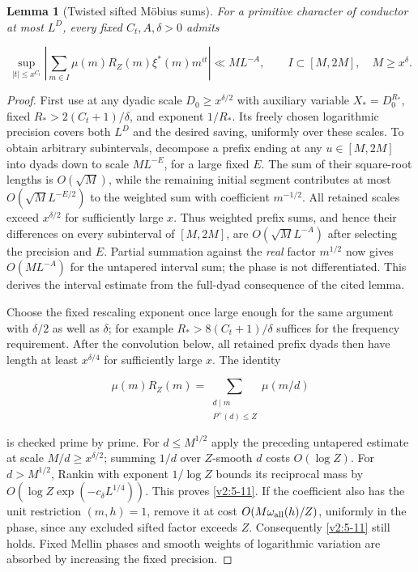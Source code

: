 \documentclass[11pt]{article}
\newtheorem{lemma}[theorem]{Lemma}
\theoremstyle{definition}
\theoremstyle{remark}
\numberwithin{equation}{section}
\begin{document}
\begin{lemma}[Twisted sifted M\"obius sums]\label{input:sifted}
For a primitive character of conductor at most $L^D$, every fixed $C_t,A,\delta>0$ admits


\begin{equation}\label{v2:5-11}
\sup_{|t|\le x^{C_t}}\left|\sum_{m\in I}\mu(m)R_Z(m)\xi^*(m)m^{it}\right|
\ll M L^{-A},\qquad I\subset[M,2M],\quad M\ge x^\delta.
\end{equation}


\end{lemma}\begin{proof}First use \cite[Lemma~3.9(ii)]{MSTT} at any dyadic scale $D_0\ge x^{\delta/2}$ with auxiliary variable $X_*=D_0^{R_*}$, fixed $R_*>2(C_t+1)/\delta$, and exponent $1/R_*$. Its freely chosen logarithmic precision covers both $L^D$ and the desired saving, uniformly over these scales. To obtain arbitrary subintervals, decompose a prefix ending at any $u\in[M,2M]$ into dyads down to scale $M L^{-E}$, for a large fixed $E$. The sum of their square-root lengths is $O(\sqrt M)$, while the remaining initial segment contributes at most $O(\sqrt M L^{-E/2})$ to the weighted sum with coefficient $m^{-1/2}$. All retained scales exceed $x^{\delta/2}$ for sufficiently large $x$. Thus weighted prefix sums, and hence their differences on every subinterval of $[M,2M]$, are $O(\sqrt M L^{-A})$ after selecting the precision and $E$. Partial summation against the \emph{real} factor $m^{1/2}$ now gives $O(ML^{-A})$ for the untapered interval sum; the phase is not differentiated. This derives the interval estimate from the full-dyad consequence of the cited lemma.

Choose the fixed rescaling exponent once large enough for the
same argument with $\delta/2$ as well as $\delta$; for example
$R_*>8(C_t+1)/\delta$ suffices for the frequency requirement.
After the convolution below, all retained prefix dyads then
have length at least $x^{\delta/4}$ for sufficiently large $x$.
The identity


\begin{equation}
\mu(m)R_Z(m)=\sum_{\substack{d\mid m\\P^+(d)\le Z}}\mu(m/d)
\end{equation}


is checked prime by prime. For $d\le M^{1/2}$ apply the preceding untapered estimate at scale $M/d\ge x^{\delta/2}$; summing $1/d$ over $Z$-smooth $d$ costs $O(\log Z)$. For $d>M^{1/2}$, Rankin with exponent $1/\log Z$ bounds its reciprocal mass by $O(\log Z\exp(-c_\delta L^{1/4}))$. This proves \eqref{v2:5-11}. If the coefficient also has the unit restriction $(m,h)=1$, remove it at cost $O(M\omega_{\rm all}(h)/Z)$, uniformly in the phase, since any excluded sifted factor exceeds $Z$. Consequently \eqref{v2:5-11} still holds. Fixed Mellin phases and smooth weights of logarithmic variation are absorbed by increasing the fixed precision.

\end{proof}
\end{document}
